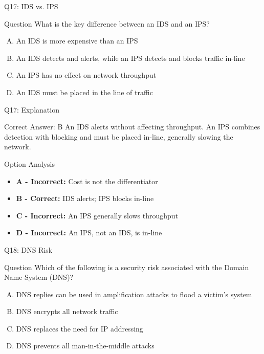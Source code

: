 \documentclass{beamer}
\begin{document}
	\begin{frame}{Q17: IDS vs. IPS}
		\begin{block}{Question}
			What is the key difference between an IDS and an IPS?
		\end{block}
		\begin{enumerate}[(A)]
			\item An IDS is more expensive than an IPS
			\item An IDS detects and alerts, while an IPS detects and blocks traffic in-line
			\item An IPS has no effect on network throughput
			\item An IDS must be placed in the line of traffic
		\end{enumerate}
	\end{frame}
	
	\begin{frame}{Q17: Explanation}
		\begin{block}{Correct Answer: B}
			An IDS alerts without affecting throughput. An IPS combines detection with blocking and must be placed in-line, generally slowing the network.
		\end{block}
		\begin{block}{Option Analysis}
			\begin{itemize}
				\item \textbf{A - Incorrect:} Cost is not the differentiator
				\item \textbf{B - Correct:} IDS alerts; IPS blocks in-line
				\item \textbf{C - Incorrect:} An IPS generally slows throughput
				\item \textbf{D - Incorrect:} An IPS, not an IDS, is in-line
			\end{itemize}
		\end{block}
	\end{frame}
	
	\begin{frame}{Q18: DNS Risk}
		\begin{block}{Question}
			Which of the following is a security risk associated with the Domain Name System (DNS)?
		\end{block}
		\begin{enumerate}[(A)]
			\item DNS replies can be used in amplification attacks to flood a victim's system
			\item DNS encrypts all network traffic
			\item DNS replaces the need for IP addressing
			\item DNS prevents all man-in-the-middle attacks
		\end{enumerate}
	\end{frame}
	
\end{document}
